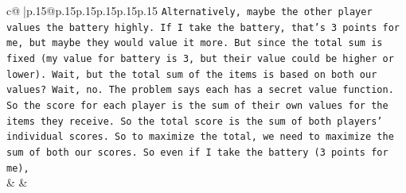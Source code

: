 \documentclass{article}
\begin{document}
{\begin{supertabular}{c@{$\;$}|p{.15\linewidth}@{}p{.15\linewidth}p{.15\linewidth}p{.15\linewidth}p{.15\linewidth}p{.15\linewidth}}
{{{\texttt{Alternatively, maybe the other player values the battery highly. If I take the battery, that's 3 points for me, but maybe they would value it more. But since the total sum is fixed (my value for battery is 3, but their value could be higher or lower). Wait, but the total sum of the items is based on both our values? Wait, no. The problem says each has a secret value function. So the score for each player is the sum of their own values for the items they receive. So the total score is the sum of both players' individual scores. So to maximize the total, we need to maximize the sum of both our scores. So even if I take the battery (3 points for me),} \\
            }
        }
    }
    & & \\ \\


\end{supertabular}}
\end{document}
